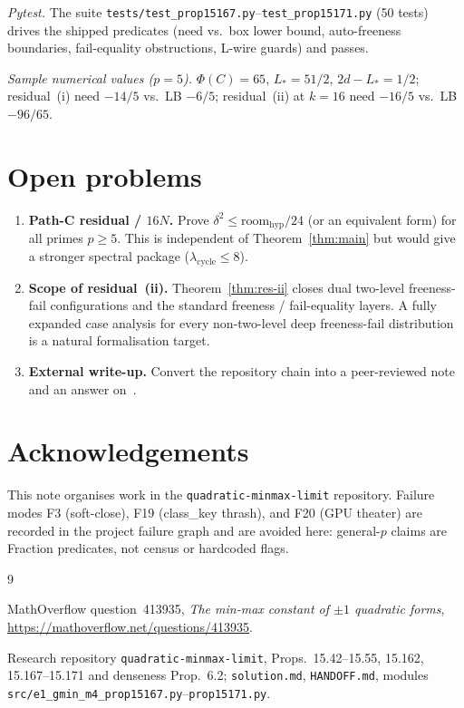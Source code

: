 \documentclass[11pt,a4paper]{article}
\theoremstyle{plain}
\theoremstyle{definition}
\begin{document}
\noindent\textit{Pytest.}
The suite \texttt{tests/test\_prop15167.py}--\texttt{test\_prop15171.py} (50 tests) drives
the shipped predicates (need vs.\ box lower bound, auto-freeness boundaries, fail-equality
obstructions, L-wire guards) and passes.

\noindent\textit{Sample numerical values ($p=5$).}
$\Phi(C)=65$, $L_*=51/2$, $2d-L_*=1/2$; residual~(i) need $-14/5$ vs.\ LB $-6/5$;
residual~(ii) at $k=16$ need $-16/5$ vs.\ LB $-96/65$.

\section{Open problems}

\begin{enumerate}[label=\arabic*.]
\item \textbf{Path-C residual / $16N$.}
  Prove $\delta^2\le\mathrm{room}_{\mathrm{hyp}}/24$ (or an equivalent form) for all primes
  $p\ge5$. This is independent of Theorem~\ref{thm:main} but would give a stronger spectral
  package ($\lambda_{\mathrm{cycle}}\le8$).
\item \textbf{Scope of residual~(ii).}
  Theorem~\ref{thm:res-ii} closes dual two-level freeness-fail configurations and the
  standard freeness / fail-equality layers. A fully expanded case analysis for every
  non-two-level deep freeness-fail distribution is a natural formalisation target.
\item \textbf{External write-up.}
  Convert the repository chain into a peer-reviewed note and an answer on~\cite{MO413935}.
\end{enumerate}

\section*{Acknowledgements}

This note organises work in the \texttt{quadratic-minmax-limit} repository.
Failure modes F3 (soft-close), F19 (class\_key thrash), and F20 (GPU theater) are recorded
in the project failure graph and are avoided here: general-$p$ claims are Fraction
predicates, not census or hardcoded flags.

\begin{thebibliography}{9}

MathOverflow question~413935,
\emph{The min-max constant of $\pm1$ quadratic forms},
\url{https://mathoverflow.net/questions/413935}.

Research repository \texttt{quadratic-minmax-limit},
Props.\ 15.42--15.55, 15.162, 15.167--15.171 and denseness Prop.\ 6.2;
\texttt{solution.md}, \texttt{HANDOFF.md}, modules
\texttt{src/e1\_gmin\_m4\_prop15167.py}--\texttt{prop15171.py}.

\end{thebibliography}
\end{document}
